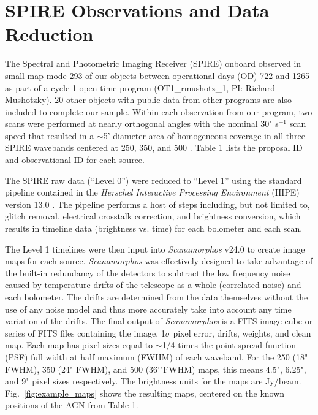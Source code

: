 \section{\herschel{} SPIRE Observations and Data Reduction}\label{sec:obs}
The Spectral and Photometric Imaging Receiver (SPIRE) \citep{Griffin:2010sf} onboard \herschel{} observed in small map mode 293 of our objects between operational days (OD) 722 and 1265 as part of a cycle 1 open time program (OT1\_rmushotz\_1, PI: Richard Mushotzky). 20 other objects with public data from other programs are also included to complete our sample. Within each observation from our program, two scans were performed at nearly orthogonal angles with the nominal 30" s$^{-1}$ scan speed that resulted in a $\sim$5' diameter area of homogeneous coverage in all three SPIRE wavebands centered at 250, 350, and 500 \um. Table 1 lists the proposal ID and observational ID for each source.

The SPIRE raw data (``Level 0'') were reduced to ``Level 1'' using the standard pipeline contained in the \textit{Herschel Interactive Processing Environment} (HIPE) version 13.0 \citep{Ott:2010rm}. The pipeline performs a host of steps including, but not limited to, glitch removal, electrical crosstalk correction, and brightness conversion, which results in timeline data (brightness vs. time) for each bolometer and each scan. 

The Level 1 timelines were then input into \textit{Scanamorphos} v24.0 \citep{Roussel:2013gf} to create image maps for each source. \textit{Scanamorphos} was effectively designed to take advantage of the built-in redundancy of the detectors to subtract the low frequency noise caused by temperature drifts of the telescope as a whole (correlated noise) and each bolometer. The drifts are determined from the data themselves without the use of any noise model and thus more accurately take into account any time variation of the drifts. The final output of \textit{Scanamorphos} is a FITS image cube or series of FITS files containing the image, 1$\sigma$ pixel error, drifts, weights, and clean map. Each map has pixel sizes equal to $ \sim$1/4 times the point spread function (PSF) full width at half maximum (FWHM) of each waveband. For the 250 (18" FWHM), 350 (24" FWHM), and 500 \um{} (36'"FWHM) maps, this means 4.5", 6.25", and 9" pixel sizes respectively. The brightness units for the maps are Jy/beam. Fig.~\ref{fig:example_maps} shows the resulting maps, centered on the known positions of the AGN from Table 1.